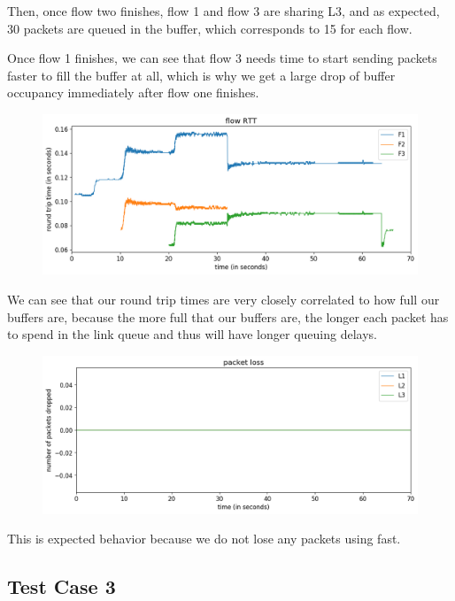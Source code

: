 \documentclass{article}
\begin{document}
Then, once flow two finishes, flow 1 and flow 3 are sharing L3, and as expected, 30 packets are queued in the buffer, which corresponds to 15 for each flow.

Once flow 1 finishes, we can see that flow 3 needs time to start sending packets faster to fill the buffer at all, which is why we get a large drop of buffer occupancy immediately after flow one finishes.

\begin{figure}[H]
\centering
\includegraphics[width = \textwidth]{test_case2_fast flow RTT.png}
\end{figure}

We can see that our round trip times are very closely correlated to how full our buffers are, because the more full that our buffers are, the longer each packet has to spend in the link queue and thus will have longer queuing delays.

\begin{figure}[H]
\centering
\includegraphics[width = \textwidth]{test_case2_fast packet loss.png}
\end{figure}

This is expected behavior because we do not lose any packets using fast.



\subsection{Test Case 3} 
\end{document}

